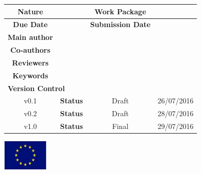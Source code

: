 	\bigskip
	\begin{center}
	\begin{tabular}{|c|c|c|c|}
	\hline
	\textbf{Nature} & \DeliverableNature & \textbf{Work Package} & \Workpackage \\ \hline

	\textbf{Due Date}  &  \DeliverableDueDate & \textbf{Submission Date}  & \DeliverableSubmissionDate  \\ \hline

	\textbf{Main author}  & \multicolumn{3}{|l|}{\MainAuthor} \\ \hline

	\textbf{Co-authors} & \multicolumn{3}{|l|}{\CoAuthors} \\ \hline

	\textbf{Reviewers}  & \multicolumn{3}{|l|}{\Reviewers}  \\ \hline
 
	\textbf{Keywords}  & \multicolumn{3}{|l|}{\Keywords}\\ \hline
	
	\multicolumn{4}{|l|}{\textbf{Version Control}}\\ \hline
	
	v0.1 & \textbf{Status} & Draft & 26/07/2016 \\ \hline
	v0.2 & \textbf{Status} & Draft & 28/07/2016 \\ \hline
	v1.0 & \textbf{Status} & Final & 29/07/2016 \\ \hline
	\end{tabular}
	\end{center}


\vfill
\centerline{\includegraphics[height=1.5cm]{./images/EU_flag.jpg}}


\clearpage
\tableofcontents
\clearpage